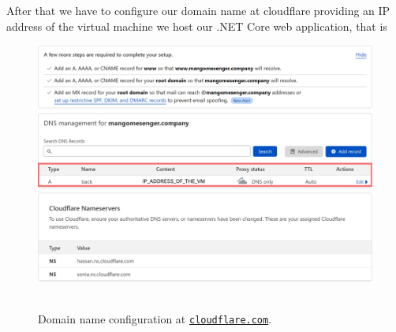 After that we have to configure our domain name at cloudflare providing an IP address of the virtual machine we host
our .NET Core web application, that is
\begin{figure}[H]
    \centering
    \includegraphics[width=1\textwidth]{img/07_domain_at_cloudflare_com}
    ~\caption{Domain name configuration at \href{https://www.cloudflare.com/}{\texttt{cloudflare.com}}.}\label{fig:figure19}
\end{figure}

